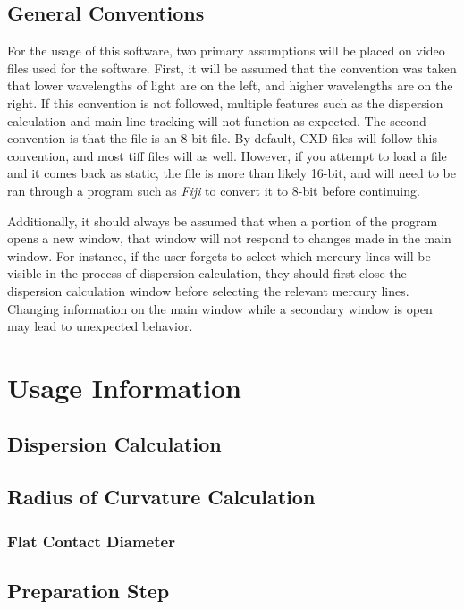 \documentclass[12pt]{extarticle}
\begin{document}
	\subsection{General Conventions}

		For the usage of this software, two primary assumptions will be placed on video files used for the software. First, it will be assumed that the convention was taken that lower wavelengths of light are on the left, and higher wavelengths are on the right. 
		If this convention is not followed, multiple features such as the dispersion calculation and main line tracking will not function as expected. The second convention is that the file is an 8-bit file. By default, CXD files will follow this convention, and most tiff files will as well.
		However, if you attempt to load a file and it comes back as static, the file is more than likely 16-bit, and will need to be ran through a program such as \textit{Fiji} to convert it to 8-bit before continuing.

		Additionally, it should always be assumed that when a portion of the program opens a new window, that window will not respond to changes made in the main window. For instance, if the user forgets to select which mercury lines will be visible in the process of dispersion calculation, they should first close the dispersion calculation window before selecting the relevant mercury lines.
		Changing information on the main window while a secondary window is open may lead to unexpected behavior.
\section{Usage Information} 
	\subsection{Dispersion Calculation}

	\subsection{Radius of Curvature Calculation}

		\subsubsection{Flat Contact Diameter}

	\subsection{Preparation Step}
\end{document}
